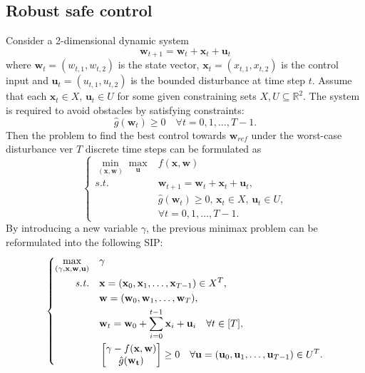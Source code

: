 \documentclass{amsart}
\theoremstyle{plain}
\newcommand{\re}{\mathbb{R}}
\newcommand{\st}{\mathit{s.t.}}
\newcommand{\bbm}{\begin{bmatrix}}
\newcommand{\ebm}{\end{bmatrix}}
\numberwithin{equation}{section}
\begin{document}
	\subsection{Robust safe control}
	Consider a 2-dimensional dynamic system 
	\[
	\mathbf{w}_{t+1} = \mathbf{w}_t+\mathbf{x}_t+\mathbf{u}_t
	\]
	where $\mathbf{w}_t = (w_{t,1},w_{t,2})$ is the state vector, $\mathbf{x}_t=(x_{t,1}, x_{t,2})$ is the control input and 
	$\mathbf{u}_t=(u_{t,1}, u_{t,2})$ is the bounded disturbance at time step $t$.
    Assume that each $\mathbf{x}_t\in X,\,\mathbf{u}_t\in U$
    for some given constraining sets $X,U\subseteq \re^2$.
     The system is required to avoid obstacles by satisfying constraints:
    \[ \hat{g}(\mathbf{w}_t)\ge 0\quad \forall t =0,1,\ldots, T-1.\]
	Then the problem to find the best control towards $\mathbf{w}_{ref}$ under the 
    worst-case disturbance ver $T$ discrete time steps can be formulated as 
	\[ \left\{
	\begin{array}{cl}
		\min\limits_{(\mathbf{x},\mathbf{w})} \max\limits_{\mathbf{u}} & f(\mathbf{x},\mathbf{w}) \\
		\st & \mathbf{w}_{t+1} = \mathbf{w}_t+\mathbf{x}_t+\mathbf{u}_t,\\
		&  \hat{g}(\mathbf{w}_t)\ge 0,\, \mathbf{x}_t\in X,\,\mathbf{u}_t\in U,\\
        & \forall t = 0,1,\ldots, T-1.
	\end{array}\right. \]
    By introducing a new variable $\gamma$, the previous minimax problem 
    can be reformulated into the following SIP:
    \begin{equation}\label{eq:rsc_sip}
        \left\{\begin{aligned}
        \max\limits_{(\gamma,\mathbf{x},\mathbf{w},\mathbf{u})}\quad & \gamma\\
        \st\quad & \mathbf{x} = (\mathbf{x}_0,\mathbf{x}_1,\ldots, \mathbf{x}_{T-1})\in X^{T},\\
        & \mathbf{w} = (\mathbf{w}_0,\mathbf{w}_1,\ldots, \mathbf{w}_{T}),\\
        & \mathbf{w}_t = \mathbf{w}_0+ \sum\limits_{i = 0}^{t-1} \mathbf{x}_i+\mathbf{u}_i\quad \forall t\in[T],\\
        & \bbm \gamma-f(\mathbf{x}, \mathbf{w}) \\ \hat{g}(\bf{w}_t)\ebm \ge 0\quad
        \forall \mathbf{u} = (\mathbf{u}_0,\mathbf{u}_1,\ldots, \mathbf{u}_{T-1})\in U^T.
        \end{aligned}
        \right.
    \end{equation}
\end{document}
